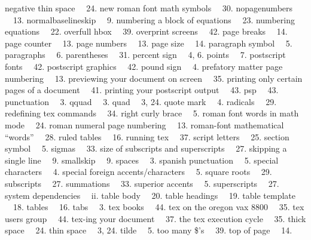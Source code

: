 {negative thin space \ \leaderfill \  24.
new roman font math symbols \ \leaderfill \  30.
nopagenumbers \ \leaderfill \  13.
normalbaselineskip \ \leaderfill \  9.
numbering a block of equations \ \leaderfill \  23.
numbering equations \ \leaderfill \  22.
\bigskip
overfull hbox \ \leaderfill \  39.
overprint screens \ \leaderfill \  42.
\bigskip
page breaks \ \leaderfill \  14.
page counter \ \leaderfill \  13.
page numbers \ \leaderfill \  13.
page size \ \leaderfill \  14.
paragraph symbol \ \leaderfill \  5.
paragraphs \ \leaderfill \  6.
parentheses \ \leaderfill \  31.
percent sign \ \leaderfill \  4, 6.
points \ \leaderfill \  7.
postscript fonts \ \leaderfill \  42.
postscript graphics \ \leaderfill \  42.
pound sign \ \leaderfill \  4.
prefatory matter page numbering \ \leaderfill \  13.
previewing your document on screen \ \leaderfill \  35.
printing only certain pages of a document \ \leaderfill \  41.
printing your postscript output \ \leaderfill \  43.
psp \ \leaderfill \  43.
punctuation \ \leaderfill \  3.
\bigskip
qquad \ \leaderfill \  3.
quad \ \leaderfill \  3, 24.
quote mark \ \leaderfill \  4.
\bigskip
radicals \ \leaderfill \  29.
redefining tex commands \ \leaderfill \  34.
right curly brace \ \leaderfill \  5.
roman font words in math mode \ \leaderfill \  24.
roman numeral page numbering \ \leaderfill \  13.
roman-font mathematical ``words'' \ \leaderfill \  28.
ruled tables \ \leaderfill \  16.
running tex \ \leaderfill \  37.
\bigskip
script letters \ \leaderfill \  25.
section symbol \ \leaderfill \  5.
sigmas \ \leaderfill \  33.
size of subscripts and superscripts \ \leaderfill \  27.
skipping a single line \ \leaderfill \  9.
smallskip \ \leaderfill \  9.
spaces \ \leaderfill \  3.
spanish punctuation \ \leaderfill \  5.
special characters \ \leaderfill \  4.
special foreign accents/characters \ \leaderfill \  5.
square roots \ \leaderfill \  29.
subscripts \ \leaderfill \  27.
summations \ \leaderfill \  33.
superior accents \ \leaderfill \  5.
superscripts \ \leaderfill \  27.
system dependencies \ \leaderfill \  ii.
\bigskip
table body \ \leaderfill \  20.
table headings \ \leaderfill \  19.
table template \ \leaderfill \  18.
tables \ \leaderfill \  16.
tabs \ \leaderfill \  3.
tex books \ \leaderfill \  44.
tex on the oregon vax 8800 \ \leaderfill \  35.
tex users group \ \leaderfill \  44.
tex-ing your document \ \leaderfill \  37.
the tex execution cycle \ \leaderfill \  35.
thick space \ \leaderfill \  24.
thin space \ \leaderfill \  3, 24.
tilde \ \leaderfill \  5.
too many \$'s \ \leaderfill \  39.
top of page \ \leaderfill \  14.
}
